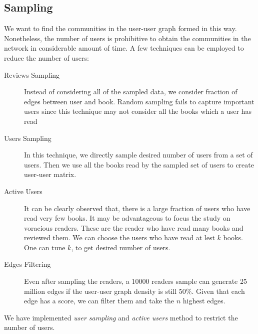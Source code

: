 \documentclass[11pt]{article}
\begin{document}
\subsection{Sampling}
We want to find the communities in the user-user graph formed in this way. Nonetheless, the number of users is prohibitive to obtain the communities in the network in considerable amount of time. A few techniques can be employed to reduce the number of users:
\begin{description}
	\item[Reviews Sampling] Instead of considering all of the sampled data, we consider fraction of edges between user and book. Random sampling fails to capture important users since this technique may not consider all the books which a user has read
    \item[Users Sampling] In this technique, we directly sample desired number of users from a set of users. Then we use all the books read by the sampled set of users to create user-user matrix.
    \item[Active Users] It can be clearly observed that, there is a large fraction of users who have read very few books. It may be advantageous to focus the study on voracious readers. These are the reader who have read many books and reviewed them. We can choose the users who have read at lest $k$ books. One can tune $k$, to get desired number of users.
     \item[Edges Filtering] Even after sampling the readers, a $10000$ readers sample can generate 25 million edges if the user-user graph density is still $50\%$. Given that each edge has a score, we can filter them and take the $n$ highest edges.
\end{description}
We have implemented {\it user sampling} and {\it active users} method to restrict the number of users.
\end{document}
